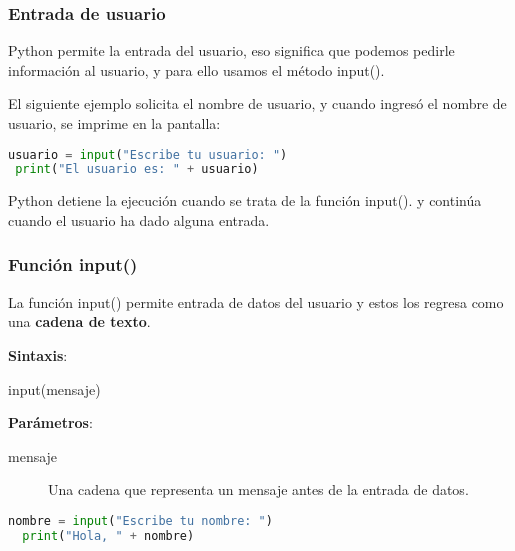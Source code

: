 \begin{frame}[fragile]
  \frametitle{Entrada de usuario}

  Python permite la entrada del usuario, eso significa que podemos pedirle
  información al usuario, y para ello usamos el método
  \textcolor{codeKeyword2}{input}().

  \vspace{\baselineskip}
  El siguiente ejemplo solicita el nombre de usuario, y cuando ingresó el
  nombre de usuario, se imprime en la pantalla:

  \vspace{\baselineskip}
  \begin{lstlisting}[language=Python]
 usuario = input("Escribe tu usuario: ")
 print("El usuario es: " + usuario)
  \end{lstlisting}

  \pausa
  \begin{exampleblock}{}
    Python detiene la ejecución cuando se trata de la función
    \textcolor{codeKeyword2}{input}().
    y continúa cuando el usuario ha dado alguna entrada.
  \end{exampleblock}
\end{frame}

\begin{frame}[fragile]
  \frametitle{Función input()}

  La función \textcolor{codeKeyword2}{input}() permite entrada de datos del
  usuario y estos los regresa como una \textbf{cadena de texto}.

  \vspace{\baselineskip}
  \textbf{Sintaxis}:

  \vspace{\baselineskip}
  \textcolor{codeKeyword2}{input}(mensaje)

  \vspace{\baselineskip}
  \textbf{Parámetros}:
  \begin{description}
    \item[mensaje] Una cadena que representa un mensaje antes de la entrada
      de datos.
  \end{description}

  \vspace{\baselineskip}
  \begin{lstlisting}[language=Python]
  nombre = input("Escribe tu nombre: ")
  print("Hola, " + nombre)
  \end{lstlisting}
\end{frame}

